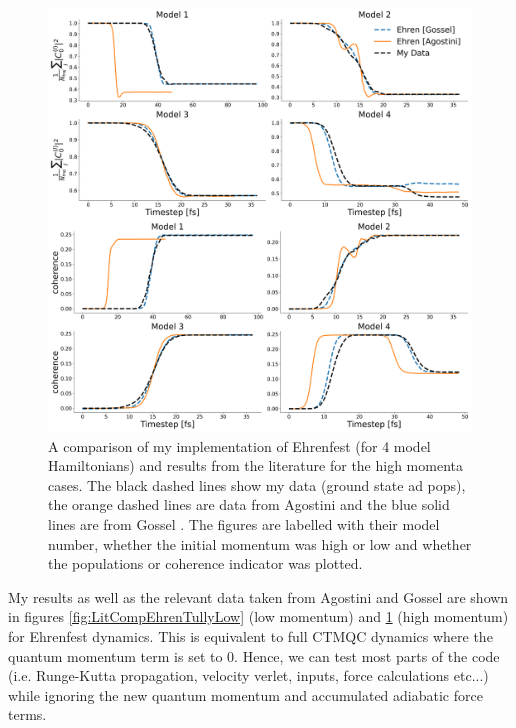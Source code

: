 \begin{figure}[ht]
	\includegraphics[width=\textwidth]{../img/CTMQC/TullyModels/Ehren_highMom.png}
	\caption{\label{fig:LitCompEhrenTullyHigh}A comparison of my implementation of Ehrenfest (for 4 model Hamiltonians) and results from the literature for the high momenta cases. The black dashed lines show my data (ground state ad pops), the orange dashed lines are data from Agostini \cite{agostini_quantum-classical_2016} and the blue solid lines are from Gossel \cite{gossel_coupled-trajectory_2018}. The figures are labelled with their model number, whether the initial momentum was high or low and whether the populations or coherence indicator was plotted.}
\end{figure}
\noindent My results as well as the relevant data taken from Agostini and Gossel \cite{agostini_quantum-classical_2016, gossel_coupled-trajectory_2018} are shown in figures \ref{fig:LitCompEhrenTullyLow} (low momentum) and \ref{fig:LitCompEhrenTullyHigh} (high momentum) for Ehrenfest dynamics. This is equivalent to full CTMQC dynamics where the quantum momentum term is set to 0. Hence, we can test most parts of the code (i.e. Runge-Kutta propagation, velocity verlet, inputs, force calculations etc...) while ignoring the new quantum momentum and accumulated adiabatic force terms.
\\\\

